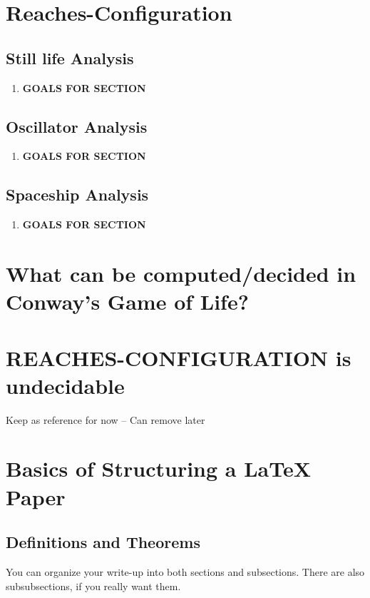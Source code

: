 \documentclass{article}
\theoremstyle{definition}
\theoremstyle{plain}
\theoremstyle{plain}
\begin{document}
\section{Reaches-Configuration}

\subsection{Still life Analysis}
\begin{enumerate}
  \item[] \textbf{GOALS FOR SECTION}
\end{enumerate}

\subsection{Oscillator Analysis}
\begin{enumerate}
  \item[] \textbf{GOALS FOR SECTION}
\end{enumerate}

\subsection{Spaceship Analysis}
\begin{enumerate}
  \item[] \textbf{GOALS FOR SECTION}
\end{enumerate}

\section{What can be computed/decided in Conway’s Game of Life?}

\section{REACHES-CONFIGURATION is undecidable}

 Keep as reference for now -- Can remove later
\section{Basics of Structuring a LaTeX Paper}

\subsection{Definitions and Theorems}
You can organize your write-up into both sections and subsections. There are also subsubsections, if you really want them. 
\end{document}

